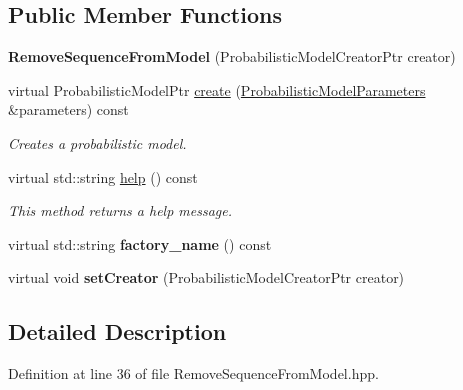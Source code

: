 \subsection*{Public Member Functions}
\begin{DoxyCompactItemize}
\item 
\mbox{\label{classtops_1_1RemoveSequenceFromModel_a8a6fe18c983df88c32019571500646d8}} 
{\bfseries Remove\+Sequence\+From\+Model} (Probabilistic\+Model\+Creator\+Ptr creator)
\item 
virtual Probabilistic\+Model\+Ptr \hyperlink{classtops_1_1RemoveSequenceFromModel_a46f4928e36936559659d9503c1edd550}{create} (\hyperlink{classtops_1_1ProbabilisticModelParameters}{Probabilistic\+Model\+Parameters} \&parameters) const
\begin{DoxyCompactList}\small\item\em Creates a probabilistic model. \end{DoxyCompactList}\item 
\mbox{\label{classtops_1_1RemoveSequenceFromModel_a0b147b31e334ab5a784e4771178bea58}} 
virtual std\+::string \hyperlink{classtops_1_1RemoveSequenceFromModel_a0b147b31e334ab5a784e4771178bea58}{help} () const
\begin{DoxyCompactList}\small\item\em This method returns a help message. \end{DoxyCompactList}\item 
\mbox{\label{classtops_1_1RemoveSequenceFromModel_ae932a9246e1df8c371b4617793ce7c16}} 
virtual std\+::string {\bfseries factory\+\_\+name} () const
\item 
\mbox{\label{classtops_1_1RemoveSequenceFromModel_a67cdb070a2e0eb4f3520180f32058d09}} 
virtual void {\bfseries set\+Creator} (Probabilistic\+Model\+Creator\+Ptr creator)
\end{DoxyCompactItemize}


\subsection{Detailed Description}


Definition at line 36 of file Remove\+Sequence\+From\+Model.\+hpp.



